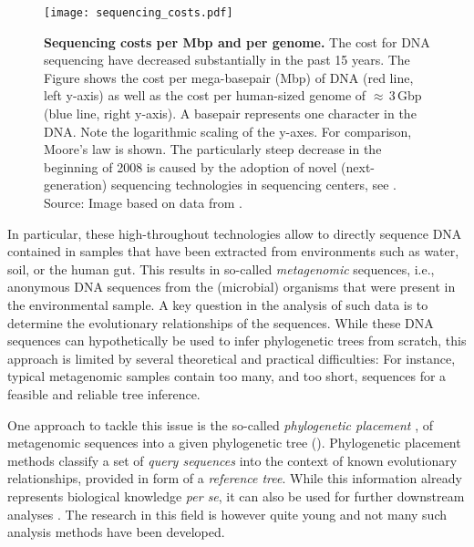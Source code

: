 \begin{figure}[hbt]
    \centering
    \texttt{[image: sequencing\_costs.pdf]}
    \caption[Sequencing costs per Mbp and per genome]{
        \textbf{Sequencing costs per Mbp and per genome.}
        The cost for DNA sequencing have decreased substantially in the past 15 years.
        The Figure shows the cost per mega-basepair (Mbp) of DNA (red line, left y-axis)
        as well as the cost per human-sized genome of $\approx$\,\num{3}\,Gbp (blue line, right y-axis).
        A basepair represents one character in the DNA.
        Note the logarithmic scaling of the y-axes.
        For comparison, Moore's law \cite{Moore1965} is shown.
        The particularly steep decrease in the beginning of 2008 is caused by
        the adoption of novel (next-generation) sequencing technologies in sequencing centers,
        see .
        Source: Image based on data from \cite{Wetterstrand2018}.
    }
    \label{fig:sequencing_costs}
\end{figure}

In particular, these high-throughout technologies allow to directly sequence DNA contained in samples
that have been extracted from environments such as water, soil, or the human gut.
This results in so-called \emph{metagenomic} sequences,
i.e., anonymous DNA sequences from the (microbial) organisms that were present in the environmental sample.
A key question in the analysis of such data is to determine the evolutionary relationships of the sequences.
While these DNA sequences can hypothetically be used to infer phylogenetic trees from scratch,
this approach is limited by several theoretical and practical difficulties:
For instance, typical metagenomic samples contain too many, and too short, sequences
for a feasible and reliable tree inference.

One approach to tackle this issue is the so-called \emph{phylogenetic placement} \cite{Matsen2010,Berger2011},
of metagenomic sequences into a given phylogenetic tree ().
Phylogenetic placement methods classify a set of \emph{query sequences}
into the context of known evolutionary relationships, provided in form of a \emph{reference tree}.
While this information already represents biological knowledge \emph{per se},
it can also be used for further downstream analyses \cite{Matsen2011a}.
The research in this field is however quite young and not many such analysis methods have been developed.

